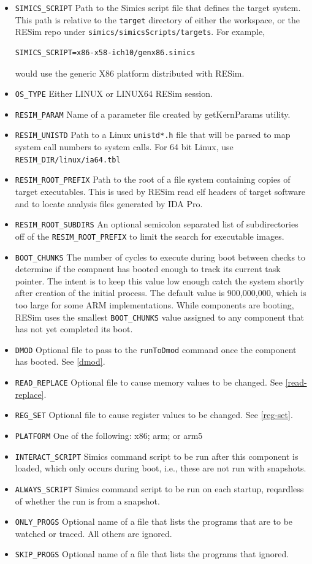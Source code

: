 \documentclass[titlepage]{article}
\begin{document}
\begin{itemize}
\item {\tt SIMICS\_SCRIPT} Path to the Simics script file that defines the target system.  This path is relative to the {\tt target} directory
of either the workspace, or the RESim repo under {\tt simics/simicsScripts/targets}.  For example, 
\begin{verbatim}
SIMICS_SCRIPT=x86-x58-ich10/genx86.simics
\end{verbatim}
\noindent would use the generic X86 platform distributed with RESim.
\item {\tt OS\_TYPE} Either LINUX or LINUX64
RESim session.
\item {\tt RESIM\_PARAM} Name of a parameter file created by getKernParams utility.
\item {\tt RESIM\_UNISTD} Path to a Linux {\tt unistd*.h} file that will be parsed to map system call numbers to system calls.  For 64 bit
Linux, use {\tt RESIM\_DIR/linux/ia64.tbl}
\item {\tt RESIM\_ROOT\_PREFIX} Path to the root of a file system containing copies of target executables.  This is used by RESim read elf
headers of target software and to locate analysis files generated by IDA Pro. 
\item {\tt RESIM\_ROOT\_SUBDIRS} An optional semicolon separated list of subdirectories off of the {\tt RESIM\_ROOT\_PREFIX} to limit the 
search for executable images.
\item {\tt BOOT\_CHUNKS} The number of cycles to execute during boot between checks to determine if the compnent has booted enough to track
its current task pointer.  The intent is to keep this value low enough catch the system shortly after creation of the initial process.
The default value is 900,000,000, which is too large for some ARM implementations.  While components are booting, RESim uses the smallest
{\tt BOOT\_CHUNKS} value assigned to any component that has not yet completed its boot.
\item {\tt DMOD} Optional file to pass to the {\tt runToDmod} command once the component has booted.  See \ref{dmod}.
\item {\tt READ\_REPLACE} Optional file to cause memory values to be changed.  See \ref{read-replace}.
\item {\tt REG\_SET} Optional file to cause register values to be changed.  See \ref{reg-set}.
\item {\tt PLATFORM} One of the following: x86; arm; or arm5
\item {\tt INTERACT\_SCRIPT} Simics command script to be run after this component is loaded, which only occurs during boot, i.e., these are not run with snapshots.
\item {\tt ALWAYS\_SCRIPT} Simics command script to be run on each startup, reqardless of whether the run is from a snapshot.
\item {\tt ONLY\_PROGS} Optional name of a file that lists the programs that are to be watched or traced.  All others are ignored.
\item {\tt SKIP\_PROGS} Optional name of a file that lists the programs that ignored.
\end{itemize}
\end{document}
